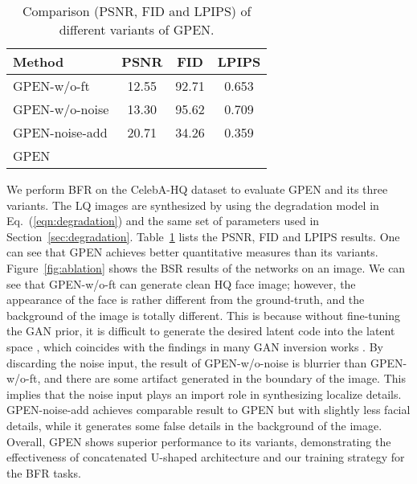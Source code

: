 \documentclass[final]{cvpr}
\begin{document}
\begin{table}[t!]
\centering
\caption{Comparison (PSNR, FID and LPIPS) of different variants of GPEN.}
\vspace*{-3mm}
   \begin{tabular}{l|c c c}
      \textbf{Method} & \textbf{PSNR} & \textbf{FID} & \textbf{LPIPS} \\
      \hline
GPEN-w/o-ft & 12.55 & 92.71 & 0.653 \\
      GPEN-w/o-noise & 13.30 & 95.62 & 0.709 \\
GPEN-noise-add & 20.71 & 34.26 & 0.359 \\
      GPEN &  &  &  \\
   \end{tabular}
\label{tab:ablation}
\vspace*{-5mm}
\end{table}

We perform BFR on the CelebA-HQ dataset to evaluate GPEN and its three variants. The LQ images are synthesized by using the degradation model in Eq.~(\ref{eqn:degradation}) and the same set of parameters used in Section~\ref{sec:degradation}. Table~\ref{tab:ablation} lists the PSNR, FID and LPIPS results. One can see that GPEN achieves better quantitative measures than its variants. Figure~\ref{fig:ablation} shows the BSR results of the networks on an image. We can see that GPEN-w/o-ft can generate clean HQ face image; however, the appearance of the face is rather different from the ground-truth, and the background of the image is totally different. This is because without fine-tuning the GAN prior, it is difficult to generate the desired latent code into the latent space , which coincides with the findings in many GAN inversion works \cite{Abdal2019Img2StyleGAN, Richardson2020pSp}. By discarding the noise input, the result of GPEN-w/o-noise is blurrier than GPEN-w/o-ft, and there are some artifact generated in the boundary of the image. This implies that the noise input plays an import role in synthesizing localize details. GPEN-noise-add achieves comparable result to GPEN but with slightly less facial details, while it generates some false details in the background of the image. Overall, GPEN shows superior performance to its variants, demonstrating the effectiveness of concatenated U-shaped architecture and our training strategy for the BFR tasks.
\end{document}
